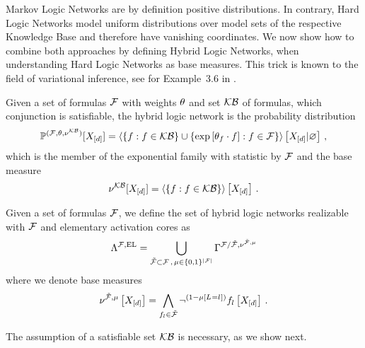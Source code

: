 \label{sec:hybridNetworks}

Markov Logic Networks are by definition positive distributions.
In contrary, Hard Logic Networks model uniform distributions over model sets of the respective Knowledge Base and therefore have vanishing coordinates.
We now show how to combine both approaches by defining Hybrid Logic Networks, when understanding Hard Logic Networks as base measures.
This trick is known to the field of variational inference, see for Example~3.6 in \cite{wainwright_graphical_2008}. 

\begin{definition}\label{def:hln}
	Given a set of formulas $\mathcal{F}$ with weights $\theta$ and set $\mathcal{KB}$ of formulas, which conjunction is satisfiable, the hybrid logic network is the probability distribution
	\begin{align*}
		\mathbb{P}^{(\mathcal{F},\theta,\nu^{\mathcal{KB}})}[X_{[d]}] 
		= \left\langle 
		\{f : f\in\mathcal{KB}\} \cup \{\mathrm{exp}\left[\theta_{f}\cdot f\right] : f\in\mathcal{F}\}
		\right\rangle \left[ X_{[d]} | \varnothing \right] \, ,
	\end{align*}
	which is the member of the exponential family with statistic by $\mathcal{F}$ and the base measure
		\[ \nu^{\mathcal{KB}}[X_{[d]}] = \left\langle \{f : f \in \mathcal{KB}\}\right\rangle \left[ X_{[d]} \right] \, .\]
		
	Given a set of formulas $\mathcal{F}$, we define the set of hybrid logic networks realizable with $\mathcal{F}$ and elementary activation cores as
	\begin{align*}
		\Lambda^{\mathcal{F},\mathrm{EL}} 
		= \bigcup_{\tilde{\mathcal{F}}\subset\mathcal{F} \, , \, \mu\in\{0,1\}^{\left|\mathcal{F}\right|}}
		\Gamma^{\mathcal{F}/\tilde{\mathcal{F}},\nu^{\tilde{\mathcal{F}},\mu}}
	\end{align*}
	where we denote base measures
	\begin{align*}
		\nu^{\tilde{\mathcal{F}},\mu}\left[X_{[d]}\right]
		= \bigwedge_{f_{l}\in\tilde{\mathcal{F}}} \lnot^{(1-\mu\left[L_{}=l_{}\right])} f_{l}\left[X_{[d]}\right] \, . 
	\end{align*}
\end{definition}

The assumption of a satisfiable set $\mathcal{KB}$ is necessary, as we show next.

